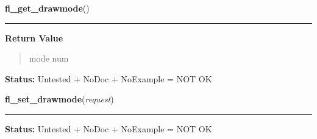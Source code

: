     \label{xformslib:library:fl_get_drawmode}

    \vspace{0.5ex}

\hspace{.8\funcindent}\begin{boxedminipage}{\funcwidth}

    \raggedright \textbf{fl\_get\_drawmode}()

    \vspace{-1.5ex}

    \rule{\textwidth}{0.5\fboxrule}
\setlength{\parskip}{2ex}
\setlength{\parskip}{1ex}
      \textbf{Return Value}
    \vspace{-1ex}

      \begin{quote}
      mode num

      \end{quote}

\textbf{Status:} Untested + NoDoc + NoExample = NOT OK



    \end{boxedminipage}

    \label{xformslib:library:fl_drawmode}

    \vspace{0.5ex}

\hspace{.8\funcindent}\begin{boxedminipage}{\funcwidth}

    \raggedright \textbf{fl\_set\_drawmode}(\textit{request})

    \vspace{-1.5ex}

    \rule{\textwidth}{0.5\fboxrule}
\setlength{\parskip}{2ex}
\setlength{\parskip}{1ex}
\textbf{Status:} Untested + NoDoc + NoExample = NOT OK



    \end{boxedminipage}

    \label{xformslib:library:fl_oval}

    \vspace{0.5ex}

